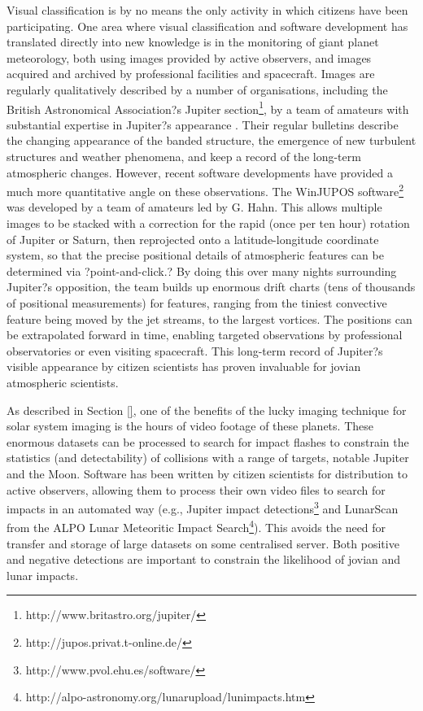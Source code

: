 \documentclass{ar2e}
\begin{document}
Visual classification is by no means the only activity in which citizens have
been participating.  One area where visual classification and software
development has translated directly into new knowledge is in the monitoring of
giant planet meteorology, both using images provided by active observers, and
images acquired and archived by professional facilities and spacecraft. 
Images are regularly qualitatively described by a number of organisations,
including the British Astronomical Association?s Jupiter
section\footnote{http://www.britastro.org/jupiter/}, by a team of amateurs
with substantial expertise in Jupiter?s appearance \citep{95rogers}.  Their
regular bulletins describe the changing appearance of the banded structure,
the emergence of new turbulent structures and weather phenomena, and keep a
record of the long-term atmospheric changes.  However, recent software
developments have provided a much more quantitative angle on these
observations.  The WinJUPOS
software\footnote{http://jupos.privat.t-online.de/} was developed by a team of
amateurs led by G. Hahn.  This allows multiple images to be stacked with a
correction for the rapid (once per ten hour) rotation of Jupiter or Saturn,
then reprojected onto a latitude-longitude coordinate system, so that the
precise positional details of atmospheric features can be determined via
?point-and-click.?  By doing this over many nights surrounding Jupiter?s
opposition, the team builds up enormous drift charts (tens of thousands of
positional measurements) for features, ranging from the tiniest convective
feature being moved by the jet streams, to the largest vortices.  The
positions can be extrapolated forward in time, enabling targeted observations
by professional observatories or even visiting spacecraft.  This long-term
record of Jupiter?s visible appearance by citizen scientists has proven
invaluable for jovian atmospheric scientists.

As described in Section \ref{}, one of the benefits of the lucky imaging
technique for solar system imaging is the hours of video footage of these
planets.  These enormous datasets can be processed to search for impact
flashes to constrain the statistics (and detectability) of collisions with a
range of targets, notable Jupiter and the Moon.  Software has been written by
citizen scientists for distribution to active observers, allowing them to
process their own video files to search for impacts in an automated way (e.g.,
Jupiter impact detections\footnote{http://www.pvol.ehu.es/software/} and
LunarScan from the ALPO Lunar Meteoritic Impact
Search\footnote{http://alpo-astronomy.org/lunarupload/lunimpacts.htm}).  This
avoids the need for transfer and storage of large datasets on some centralised
server.  Both positive and negative detections are important to constrain the
likelihood of jovian and lunar impacts.
\end{document}
